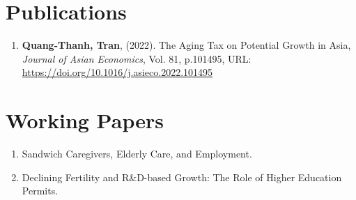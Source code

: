 \section{\sc Publications}
\begin{enumerate}
\item
  {\bf Quang-Thanh, Tran},
  (2022).
  {The Aging Tax on Potential Growth in Asia},
  {\it Journal of Asian Economics}, Vol. 81, p.101495,
  {URL: \url{https://doi.org/10.1016/j.asieco.2022.101495}}
\end{enumerate}

\section{\sc Working Papers}
\begin{enumerate}
  \item Sandwich Caregivers, Elderly Care, and Employment. %
  \item Declining Fertility and R\&D-based Growth: The Role of Higher Education Permits.
\end{enumerate}


